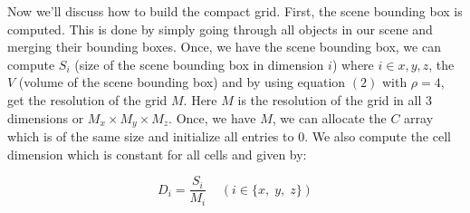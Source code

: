 \documentclass[11pt,a4paper]{article}
\begin{document}
Now we'll discuss how to build the compact grid. First, the scene bounding box is computed. This is done by simply going through all objects in our scene and merging their bounding boxes. Once, we have the scene bounding box, we can compute $S_{i}$ (size of the scene bounding box in dimension $i$) where $i \in {x, y, z}$, the $V$ (volume of the scene bounding box) and by using equation $(2)$ with $\rho = 4$, get the resolution of the grid $M$. Here $M$ is the resolution of the grid in all 3 dimensions or $M_{x} \times M_{y} \times M_{z}$. Once, we have $M$, we can allocate the $C$ array which is of the same size and initialize all entries to 0. We also compute the cell dimension which is constant for all cells and given by:

\begin{equation}
D_{i} = \frac{S_{i}}{M_{i}}\;\;\;\; (i \in \{x,\;y,\;z\})
\end{equation}
\end{document}
